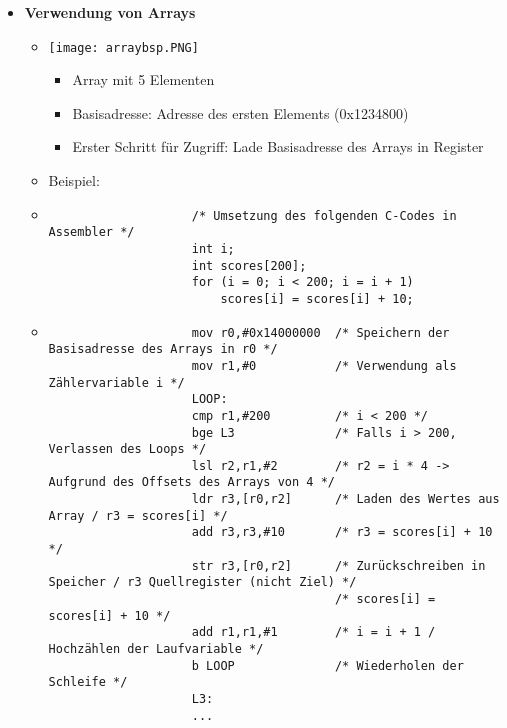 \begin{itemize}
        \item \textbf{Verwendung von Arrays}
            \begin{itemize}
                \item[]
                    \begin{minipage}{0.35\textwidth}
                        \texttt{[image: arraybsp.PNG]}
                    \end{minipage}
                    \begin{minipage}{0.55\textwidth}
                        \begin{itemize}
                            \item Array mit 5 Elementen
                            \item Basisadresse: Adresse des ersten Elements (0x1234800)
                            \item Erster Schritt für Zugriff: Lade Basisadresse des Arrays in Register
                        \end{itemize}
                    \end{minipage}
                \item Beispiel:
                \item[]
                    \begin{verbatim}
                    /* Umsetzung des folgenden C-Codes in Assembler */
                    int i;
                    int scores[200];
                    for (i = 0; i < 200; i = i + 1)
                        scores[i] = scores[i] + 10;
                    \end{verbatim}
                \item[]
                    \begin{verbatim}
                    mov r0,#0x14000000  /* Speichern der Basisadresse des Arrays in r0 */
                    mov r1,#0           /* Verwendung als Zählervariable i */
                    LOOP:               
                    cmp r1,#200         /* i < 200 */
                    bge L3              /* Falls i > 200, Verlassen des Loops */
                    lsl r2,r1,#2        /* r2 = i * 4 -> Aufgrund des Offsets des Arrays von 4 */
                    ldr r3,[r0,r2]      /* Laden des Wertes aus Array / r3 = scores[i] */
                    add r3,r3,#10       /* r3 = scores[i] + 10 */
                    str r3,[r0,r2]      /* Zurückschreiben in Speicher / r3 Quellregister (nicht Ziel) */
                                        /* scores[i] = scores[i] + 10 */
                    add r1,r1,#1        /* i = i + 1 / Hochzählen der Laufvariable */
                    b LOOP              /* Wiederholen der Schleife */
                    L3:
                    ...
                    \end{verbatim}
            \end{itemize}
    \end{itemize}

